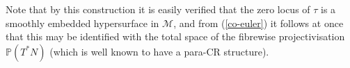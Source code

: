 
\begin{rmk}
Note that by this construction it is easily verified that the zero
locus of $\tau$ is a smoothly
embedded hypersurface in $\mathcal{M}$,  and from (\ref{co-euler}) it follows
at once that this may be identified with the total space of the
fibrewise projectivisation $\mathbb{P}(T^*N)$ (which is well known to
have a para-CR structure). 
\end{rmk}






